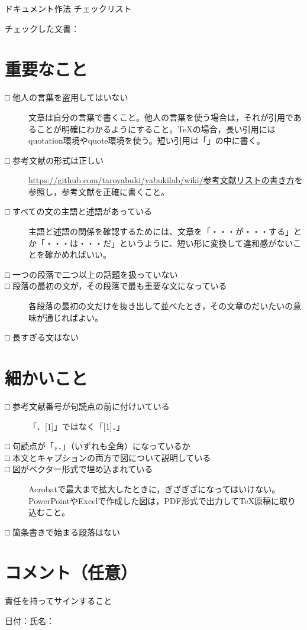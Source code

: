 \documentclass[uplatex,9pt,a5paper]{jsarticle}
\begin{document}
\begin{center}
ドキュメント作法 チェックリスト
\end{center}

\noindent チェックした文書：

\section*{重要なこと}
\begin{description}
\item[□ 他人の言葉を盗用してはいない] 文章は自分の言葉で書くこと。他人の言葉を使う場合は，それが引用であることが明確にわかるようにすること。\TeX の場合，長い引用にはquotation環境やquote環境を使う。短い引用は「」の中に書く。
\item[□ 参考文献の形式は正しい] \url{https://github.com/taroyabuki/yabukilab/wiki/参考文献リストの書き方}を参照し，参考文献を正確に書くこと。
\item[□ すべての文の主語と述語があっている] 主語と述語の関係を確認するためには、文章を「・・・が・・・する」とか「・・・は・・・だ」というように、短い形に変換して違和感がないことを確かめればいい。
\item[□ 一つの段落で二つ以上の話題を扱っていない]
\item[□ 段落の最初の文が，その段落で最も重要な文になっている] 各段落の最初の文だけを抜き出して並べたとき，その文章のだいたいの意味が通じればよい。
\item[□ 長すぎる文はない]
\end{description}

\section*{細かいこと}
\begin{description}
\item[□ 参考文献番号が句読点の前に付けいている] 「．[1]」ではなく「[1]．」
\item[□ 句読点が「，．」（いずれも全角）になっているか]
\item[□ 本文とキャプションの両方で図について説明している]
\item[□ 図がベクター形式で埋め込まれている] Acrobatで最大まで拡大したときに，ぎざぎざになってはいけない。PowerPointやExcelで作成した図は，PDF形式で出力してTeX原稿に取り込むこと。
\item[□ 箇条書きで始まる段落はない]
\end{description}

\section*{コメント（任意）}

\vspace{13truemm}\noindent 責任を持ってサインすること

\noindent 日付：\hspace{40truemm}氏名：\hspace{40truemm}
\end{document}
